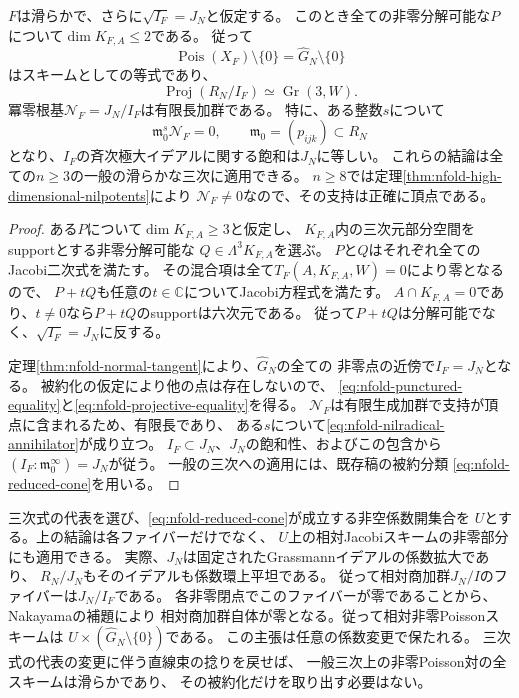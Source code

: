 \begin{corollary}[冪零構造の支持]\label{cor:nfold-vertex-support}
$F$は滑らかで、さらに$\sqrt{I_F}=J_N$と仮定する。
このとき全ての非零分解可能な$P$について$\dim K_{F,A}\le2$である。
従って
\begin{equation}\label{eq:nfold-punctured-equality}
 \operatorname{Pois}(X_F)\setminus\{0\}
       =\widehat G_N\setminus\{0\}
\end{equation}
はスキームとしての等式であり、
\begin{equation}\label{eq:nfold-projective-equality}
 \operatorname{Proj}(R_N/I_F)\simeq\operatorname{Gr}(3,W).
\end{equation}
冪零根基$\mathcal N_F=J_N/I_F$は有限長加群である。
特に、ある整数$s$について
\begin{equation}\label{eq:nfold-nilradical-annihilator}
 \mathfrak m_0^s\mathcal N_F=0,
 \qquad \mathfrak m_0=(p_{ijk})\subset R_N
\end{equation}
となり、$I_F$の斉次極大イデアルに関する飽和は$J_N$に等しい。
これらの結論は全ての$n\ge3$の一般の滑らかな三次に適用できる。
$n\ge8$では定理\ref{thm:nfold-high-dimensional-nilpotents}により
$\mathcal N_F\ne0$なので、その支持は正確に頂点である。
\end{corollary}
\begin{proof}
ある$P$について$\dim K_{F,A}\ge3$と仮定し、
$K_{F,A}$内の三次元部分空間をsupportとする非零分解可能な
$Q\in\Lambda^3K_{F,A}$を選ぶ。
$P$と$Q$はそれぞれ全てのJacobi二次式を満たす。
その混合項は全て$T_F(A,K_{F,A},W)=0$により零となるので、
$P+tQ$も任意の$t\in\mathbb C$についてJacobi方程式を満たす。
$A\cap K_{F,A}=0$であり、$t\ne0$なら$P+tQ$のsupportは六次元である。
従って$P+tQ$は分解可能でなく、$\sqrt{I_F}=J_N$に反する。

定理\ref{thm:nfold-normal-tangent}により、$\widehat G_N$の全ての
非零点の近傍で$I_F=J_N$となる。
被約化の仮定により他の点は存在しないので、
\eqref{eq:nfold-punctured-equality}と\eqref{eq:nfold-projective-equality}を得る。
$\mathcal N_F$は有限生成加群で支持が頂点に含まれるため、有限長であり、
ある$s$について\eqref{eq:nfold-nilradical-annihilator}が成り立つ。
$I_F\subset J_N$、$J_N$の飽和性、およびこの包含から
$(I_F:\mathfrak m_0^\infty)=J_N$が従う。
一般の三次への適用には、既存稿の被約分類
\eqref{eq:nfold-reduced-cone}を用いる。
\end{proof}

\begin{remark}[相対的な非零層]\label{rem:nfold-relative-punctured}
三次式の代表を選び、\eqref{eq:nfold-reduced-cone}が成立する非空係数開集合を
$U$とする。上の結論は各ファイバーだけでなく、
$U$上の相対Jacobiスキームの非零部分にも適用できる。
実際、$J_N$は固定されたGrassmannイデアルの係数拡大であり、
$R_N/J_N$もそのイデアルも係数環上平坦である。
従って相対商加群$J_N/I$のファイバーは$J_N/I_F$である。
各非零閉点でこのファイバーが零であることから、Nakayamaの補題により
相対商加群自体が零となる。従って相対非零Poissonスキームは
$U\times(\widehat G_N\setminus\{0\})$である。
この主張は任意の係数変更で保たれる。
三次式の代表の変更に伴う直線束の捻りを戻せば、
一般三次上の非零Poisson対の全スキームは滑らかであり、
その被約化だけを取り出す必要はない。
\end{remark}

